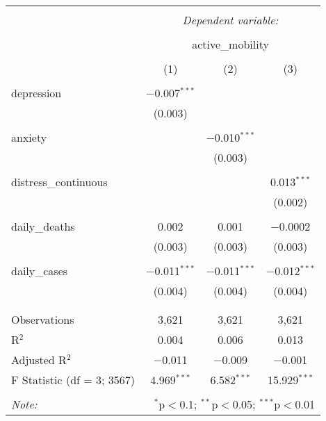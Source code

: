 
\begin{table}[!htbp] \centering 
  \caption{} 
  \label{} 
\begin{tabular}{@{\extracolsep{5pt}}lccc} 
\\[-1.8ex]\hline 
\hline \\[-1.8ex] 
 & \multicolumn{3}{c}{\textit{Dependent variable:}} \\ 
\cline{2-4} 
\\[-1.8ex] & \multicolumn{3}{c}{active\_mobility} \\ 
\\[-1.8ex] & (1) & (2) & (3)\\ 
\hline \\[-1.8ex] 
 depression & $-$0.007$^{***}$ &  &  \\ 
  & (0.003) &  &  \\ 
  & & & \\ 
 anxiety &  & $-$0.010$^{***}$ &  \\ 
  &  & (0.003) &  \\ 
  & & & \\ 
 distress\_continuous &  &  & 0.013$^{***}$ \\ 
  &  &  & (0.002) \\ 
  & & & \\ 
 daily\_deaths & 0.002 & 0.001 & $-$0.0002 \\ 
  & (0.003) & (0.003) & (0.003) \\ 
  & & & \\ 
 daily\_cases & $-$0.011$^{***}$ & $-$0.011$^{***}$ & $-$0.012$^{***}$ \\ 
  & (0.004) & (0.004) & (0.004) \\ 
  & & & \\ 
\hline \\[-1.8ex] 
Observations & 3,621 & 3,621 & 3,621 \\ 
R$^{2}$ & 0.004 & 0.006 & 0.013 \\ 
Adjusted R$^{2}$ & $-$0.011 & $-$0.009 & $-$0.001 \\ 
F Statistic (df = 3; 3567) & 4.969$^{***}$ & 6.582$^{***}$ & 15.929$^{***}$ \\ 
\hline 
\hline \\[-1.8ex] 
\textit{Note:}  & \multicolumn{3}{r}{$^{*}$p$<$0.1; $^{**}$p$<$0.05; $^{***}$p$<$0.01} \\ 
\end{tabular} 
\end{table} 
